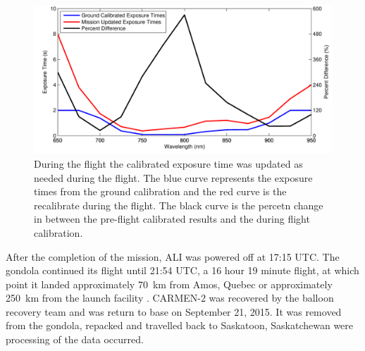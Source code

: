 \begin{figure}
    \includegraphics[width=1.0\textwidth]{./Images/5-1-ExposureTimeComparisons.pdf}
    \caption[Exposure Time Update During Balloon Flight]{During the flight the calibrated exposure time was updated as needed during the flight. The blue curve represents the exposure times from the ground calibration and the red curve is the recalibrate during the flight. The black curve is the percetn change in between the pre-flight calibrated results and the during flight calibration.}
    \label{fig:5.1:exposureTimeComparisons}
\end{figure}

After the completion of the mission, ALI was powered off at 17:15 UTC. The gondola continued its flight until 21:54 UTC, a 16 hour 19 minute flight, at which point it landed approximately 70~km from Amos, Quebec or approximately 250~km from the launch facility . CARMEN-2 was recovered by the balloon recovery team and was return to base on September 21, 2015. It was removed from the gondola, repacked and travelled back to Saskatoon, Saskatchewan were processing of the data occurred. 